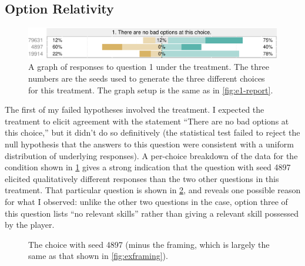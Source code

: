 \subsection{Option Relativity}


\begin{figure}[!t]
  \includegraphics[width=\textwidth]{fig/relaxed-q1.pdf}
  \caption[``No bad options'' responses for relaxed choices]{A graph of responses to question 1 under the \rlx{} treatment. The three numbers are the seeds used to generate the three different choices for this treatment. The graph setup is the same as in \cref{fig:e1-report}.}
  \label{fig:e1-relaxedq1}
\end{figure}


The first of my failed hypotheses involved the \rlx{} treatment.
%
I expected the \rlx{} treatment to elicit agreement with the statement ``There are no bad options at this choice,'' but it didn't do so definitively (the statistical test failed to reject the null hypothesis that the answers to this question were consistent with a uniform distribution of underlying responses).
%
A per-choice breakdown of the data for the \rlx{} condition shown in \cref{fig:e1-relaxedq1} gives a strong indication that the question with seed 4897 elicited qualitatively different responses than the two other questions in this treatment.
%
That particular question is shown in \cref{fig:e1-seed-4897}, and reveals one possible reason for what I observed: unlike the other two questions in the \rlx{} case, option three of this question lists ``no relevant skills'' rather than giving a relevant skill possessed by the player.


\begin{figure}[!t]
\centering
{}
\caption[``Relaxed'' choice 4897]{The \rlx{} choice with seed 4897 (minus the framing, which is largely the same as that shown in \cref{fig:exframing}).}
  \label{fig:e1-seed-4897}
\end{figure}


